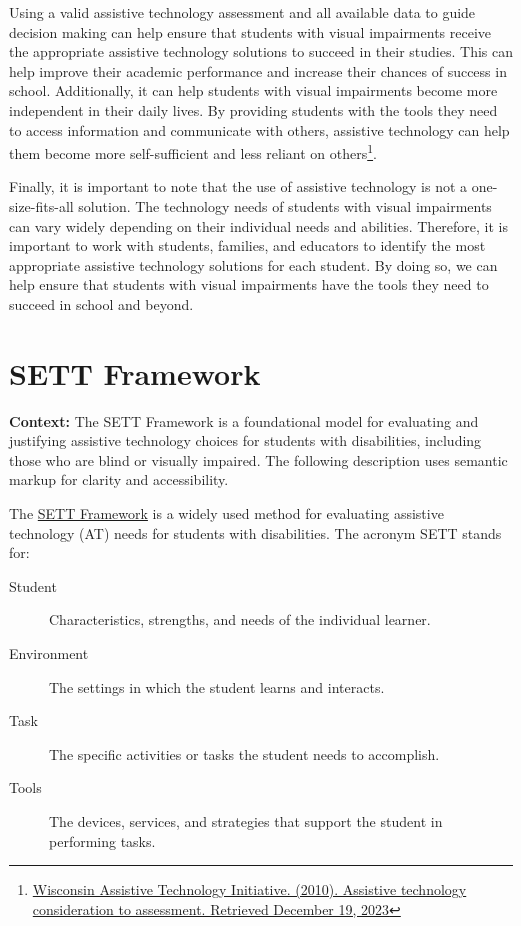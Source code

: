Using a valid assistive technology assessment and all available data to guide decision making can help ensure that students with visual impairments receive the appropriate assistive technology solutions to succeed in their studies. This can help improve their academic performance and increase their chances of success in school. Additionally, it can help students with visual impairments become more independent in their daily lives. By providing students with the tools they need to access information and communicate with others, assistive technology can help them become more self-sufficient and less reliant on others\footnote{\raggedright \href{https://www.wati.org/free-publications/assistive-technology-consideration-to-assessment/}{Wisconsin Assistive Technology Initiative. (2010). Assistive technology consideration to assessment. Retrieved December 19, 2023}}.

Finally, it is important to note that the use of assistive technology is not a one-size-fits-all solution. The technology needs of students with visual impairments can vary widely depending on their individual needs and abilities. Therefore, it is important to work with students, families, and educators to identify the most appropriate assistive technology solutions for each student. By doing so, we can help ensure that students with visual impairments have the tools they need to succeed in school and beyond.

\section{SETT Framework}\label{trouble41}

\noindent
\textbf{Context:} The SETT Framework is a foundational model for evaluating and justifying assistive technology choices for students with disabilities, including those who are blind or visually impaired. The following description uses semantic markup for clarity and accessibility.

The \href{https://www.joyzabala.com/links-resources}{SETT Framework} \cite{ZabalaSETT, MNSETT} is a widely used method for evaluating assistive technology (AT) needs for students with disabilities. The acronym SETT stands for:

\begin{description}
  \item[Student] Characteristics, strengths, and needs of the individual learner.
  \item[Environment] The settings in which the student learns and interacts.
  \item[Task] The specific activities or tasks the student needs to accomplish.
  \item[Tools] The devices, services, and strategies that support the student in performing tasks.
\end{description}

